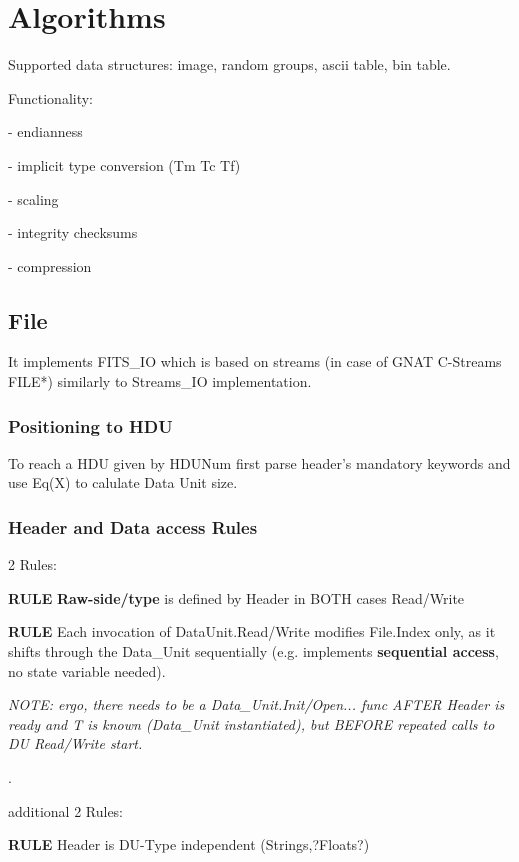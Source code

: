 \documentclass[a4paper,10pt]{article}
\begin{document}
\section{Algorithms}

Supported data structures: image, random groups, ascii table, bin table.

Functionality:

- endianness

- implicit type conversion (Tm Tc Tf)

- scaling

- integrity checksums

- compression



\subsection{File}
It implements FITS\_IO which is based on streams (in case of GNAT C-Streams FILE*) similarly to Streams\_IO implementation.



\subsubsection{Positioning to HDU}

To reach a HDU given by HDUNum first parse header's mandatory keywords and use Eq(X)
to calulate Data Unit size. 


\subsubsection{Header and Data access Rules}

2 Rules:

\textbf{RULE} \textbf{Raw-side/type} is defined by Header in BOTH cases Read/Write

\textbf{RULE} Each invocation of DataUnit.Read/Write modifies File.Index only, as it shifts through the Data\_Unit sequentially (e.g. implements \textbf{sequential access}, no state variable needed).

\textit{NOTE: ergo, there needs to be a Data\_Unit.Init/Open... func AFTER Header is ready and T is known (Data\_Unit instantiated), but BEFORE repeated calls to DU Read/Write start.}

.

additional 2 Rules:

\textbf{RULE} Header is DU-Type independent (Strings,?Floats?)
\end{document}
